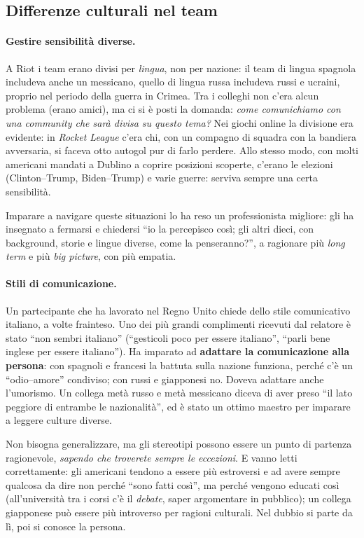 \subsection{Differenze culturali nel team}

\paragraph{Gestire sensibilità diverse.} A Riot i team erano divisi per
\emph{lingua}, non per nazione: il team di lingua spagnola includeva anche un
messicano, quello di lingua russa includeva russi e ucraini, proprio nel
periodo della guerra in Crimea. Tra i colleghi non c'era alcun problema (erano
amici), ma ci si è posti la domanda: \emph{come comunichiamo con una community
che sarà divisa su questo tema?} Nei giochi online la divisione era evidente:
in \emph{Rocket League} c'era chi, con un compagno di squadra con la bandiera
avversaria, si faceva otto autogol pur di farlo perdere. Allo stesso modo,
con molti americani mandati a Dublino a coprire posizioni scoperte, c'erano le
elezioni (Clinton--Trump, Biden--Trump) e varie guerre: serviva sempre una
certa sensibilità.

Imparare a navigare queste situazioni lo ha reso un professionista migliore:
gli ha insegnato a fermarsi e chiedersi ``io la percepisco così; gli altri
dieci, con background, storie e lingue diverse, come la penseranno?'', a
ragionare più \emph{long term} e più \emph{big picture}, con più empatia.

\paragraph{Stili di comunicazione.} Un partecipante che ha lavorato nel Regno
Unito chiede dello stile comunicativo italiano, a volte frainteso. Uno dei più
grandi complimenti ricevuti dal relatore è stato ``non sembri italiano''
(``gesticoli poco per essere italiano'', ``parli bene inglese per essere
italiano''). Ha imparato ad \textbf{adattare la comunicazione alla persona}:
con spagnoli e francesi la battuta sulla nazione funziona, perché c'è un
``odio--amore'' condiviso; con russi e giapponesi no. Doveva adattare anche
l'umorismo. Un collega metà russo e metà messicano diceva di aver preso ``il
lato peggiore di entrambe le nazionalità'', ed è stato un ottimo maestro per
imparare a leggere culture diverse.

Non bisogna generalizzare, ma gli stereotipi possono essere un punto di
partenza ragionevole, \emph{sapendo che troverete sempre le eccezioni}. E
vanno letti correttamente: gli americani tendono a essere più estroversi e ad
avere sempre qualcosa da dire non perché ``sono fatti così'', ma perché
vengono educati così (all'università tra i corsi c'è il \emph{debate}, saper
argomentare in pubblico); un collega giapponese può essere più introverso per
ragioni culturali. Nel dubbio si parte da lì, poi si conosce la persona.

